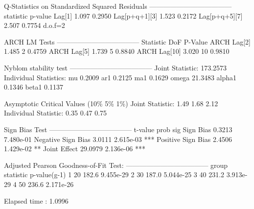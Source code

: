 \begin{Schunk}
\begin{Soutput}
Q-Statistics on Standardized Squared Residuals
------------------------------------
              statistic p-value
Lag[1]            1.097  0.2950
Lag[p+q+1][3]     1.523  0.2172
Lag[p+q+5][7]     2.507  0.7754
d.o.f=2

ARCH LM Tests
------------------------------------
             Statistic DoF P-Value
ARCH Lag[2]      1.485   2  0.4759
ARCH Lag[5]      1.739   5  0.8840
ARCH Lag[10]     3.020  10  0.9810

Nyblom stability test
------------------------------------
Joint Statistic:  173.2573
Individual Statistics:
mu      0.2009
ar1     0.2125
ma1     0.1629
omega  21.3483
alpha1  0.1346
beta1   0.1137

Asymptotic Critical Values (10\% 5\% 1\%)
Joint Statistic:     	 1.49 1.68 2.12
Individual Statistic:	 0.35 0.47 0.75

Sign Bias Test
------------------------------------
                   t-value      prob sig
Sign Bias           0.3213 7.480e-01
Negative Sign Bias  3.0111 2.615e-03 ***
Positive Sign Bias  2.4506 1.429e-02  **
Joint Effect       29.0979 2.136e-06 ***


Adjusted Pearson Goodness-of-Fit Test:
------------------------------------
  group statistic p-value(g-1)
1    20     182.6    9.455e-29
2    30     187.0    5.044e-25
3    40     231.2    3.913e-29
4    50     236.6    2.171e-26


Elapsed time : 1.0996
\end{Soutput}
\end{Schunk}

